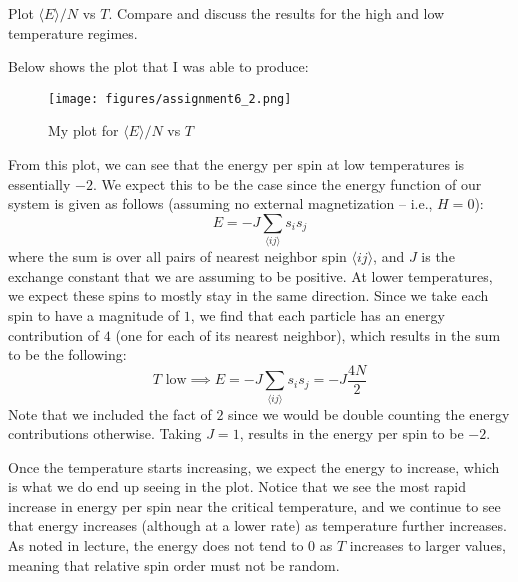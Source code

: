 \begin{qBox}{2}
Plot \( \langle E \rangle / N \) vs \( T \). 
Compare and discuss the results for the high and low temperature regimes.

\tcblower

Below shows the plot that I was able to produce: 

\begin{figure}[H]
    \centering
    \texttt{[image: figures/assignment6\_2.png]}
    \caption{My plot for \( \langle E \rangle / N \) vs \( T \)}
\end{figure}

From this plot, we can see that the energy per spin at low temperatures is essentially
\( -2 \).
We expect this to be the case since the energy function of our system is given as 
follows (assuming no external magnetization -- i.e., \( H = 0 \)): 
\begin{equation*}
    E
    =
    - J \sum_{ \langle i j \rangle } s_{ i } s_{ j }
\end{equation*}
where the sum is over all pairs of nearest neighbor spin \( \langle i j \rangle \),
and \( J \) is the exchange constant that we are assuming to be positive. 
At lower temperatures, we expect these spins to mostly stay in the same direction.
Since we take each spin to have a magnitude of \( 1 \), we find that each particle 
has an energy contribution of \( 4 \) (one for each of its nearest neighbor),
which results in the sum to be the following:
\begin{equation*}
    T \text{ low}
    \implies 
    E = - J \sum_{ \langle i j \rangle } s_{ i } s_{ j } = - J \frac{ 4 N }{ 2 }
\end{equation*}
Note that we included the fact of \( 2 \) since we would be double counting the 
energy contributions otherwise.
Taking \( J = 1 \), results in the energy per spin to be \( -2 \).

\baseSkip 

Once the temperature starts increasing, we expect the energy to increase, which is 
what we do end up seeing in the plot.
Notice that we see the most rapid increase in energy per spin near the critical 
temperature, and we continue to see that energy increases (although at a lower rate)
as temperature further increases.
As noted in lecture, the energy does not tend to \( 0 \) as \( T \) increases to 
larger values, meaning that relative spin order must not be random.
\end{qBox}